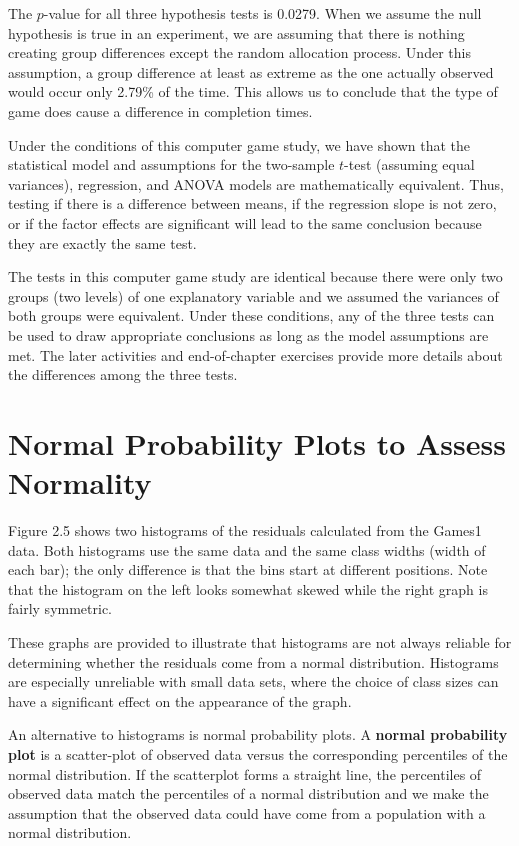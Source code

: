\documentclass[
]{book}
\begin{document}
The \(p\)-value for all three hypothesis tests is 0.0279. When we assume the null hypothesis is true in an experiment, we are assuming that there is nothing creating group differences except the random allocation process. Under this assumption, a group difference at least as extreme as the one actually observed would occur only 2.79\% of the time. This allows us to conclude that the type of game does cause a difference in completion times.

Under the conditions of this computer game study, we have shown that the statistical model and assumptions for the two-sample \(t\)-test (assuming equal variances), regression, and ANOVA models are mathematically equivalent. Thus, testing if there is a difference between means, if the regression slope is not zero, or if the factor effects are significant will lead to the same conclusion because they are exactly the same test.

The tests in this computer game study are identical because there were only two groups (two levels) of one explanatory variable and we assumed the variances of both groups were equivalent. Under these conditions, any of the three tests can be used to draw appropriate conclusions as long as the model assumptions are met. The later activities and end-of-chapter exercises provide more details about the differences among the three tests.

\hypertarget{normal-probability-plots-to-assess-normality}{%
\section{Normal Probability Plots to Assess Normality}\label{normal-probability-plots-to-assess-normality}}

Figure 2.5 shows two histograms of the residuals calculated from the Games1 data. Both histograms use the same data and the same class widths (width of each bar); the only difference is that the bins start at different positions. Note that the histogram on the left looks somewhat skewed while the right graph is fairly symmetric.

These graphs are provided to illustrate that histograms are not always reliable for determining whether the residuals come from a normal distribution. Histograms are especially unreliable with small data sets, where the choice of class sizes can have a significant effect on the appearance of the graph.

An alternative to histograms is normal probability plots. A \textbf{normal probability plot} is a scatter-plot of observed data versus the corresponding percentiles of the normal distribution. If the scatterplot forms a straight line, the percentiles of observed data match the percentiles of a normal distribution and we make the assumption that the observed data could have come from a population with a normal distribution.
\end{document}
